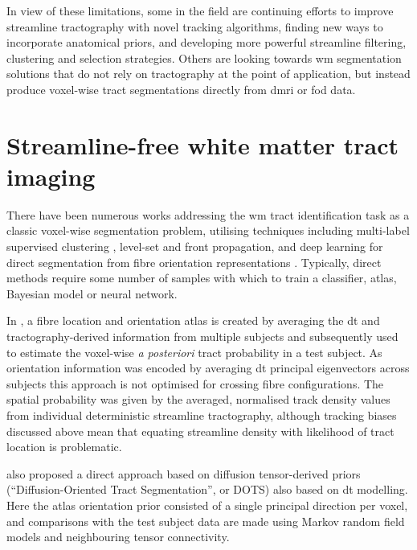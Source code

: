 \documentclass[12pt,phd,a4paper,twoside]{ucl_thesis}
\renewcommand{\textcite}[2][]{
\ifthenelse { \equal {#1} {} }  {\citeauthor{#2}\autocite{#2}}   {\citeauthor{#1}\autocite{#2}}}
\begin{document}
In view of these limitations, some in the field are continuing efforts to improve streamline tractography with novel tracking algorithms, finding new ways to incorporate anatomical priors, and developing more powerful streamline filtering, clustering and selection strategies.
Others are looking towards \gls{wm} segmentation solutions that do not rely on tractography at the point of application, but instead produce voxel-wise tract segmentations directly from \gls{dmri} or \gls{fod} data.

\section{Streamline-free white matter tract imaging}

There have been numerous works addressing the \gls{wm} tract identification task as a classic voxel-wise segmentation problem, utilising techniques including multi-label supervised clustering \autocite{Ratnarajah2014}, level-set and front propagation\autocite{Nazem-Zadeh2011, Hao2014}, and deep learning for direct segmentation from fibre orientation representations \autocite{Wasserthal2018,Li2020}.
Typically, direct methods require some number of samples with which to train a classifier, atlas, Bayesian model or neural network.

In \textcite{Hagler2009}, a fibre location and orientation atlas is created by averaging the \gls{dt} and tractography-derived information from multiple subjects and subsequently used to estimate the voxel-wise \textit{a posteriori} tract probability in a test subject.
As orientation information was encoded by averaging \gls{dt} principal eigenvectors across subjects this approach is not optimised for crossing fibre configurations.
The spatial probability was given by the averaged, normalised track density values from individual deterministic streamline tractography, although tracking biases discussed above mean that equating streamline density with likelihood of tract location is problematic\autocite{Rheault2019,Smith2013}.
\textcite{Bazin2011} also proposed a direct approach based on diffusion tensor-derived priors (``Diffusion-Oriented Tract Segmentation'', or DOTS) also based on \gls{dt} modelling.
Here the atlas orientation prior consisted of a single principal direction per voxel, and comparisons with the test subject data are made using Markov random field models and neighbouring tensor connectivity.
\end{document}
